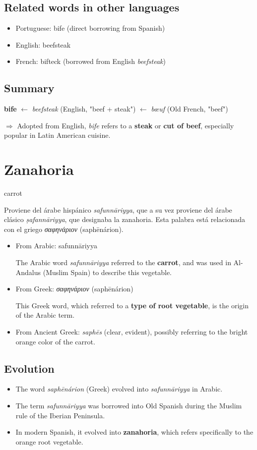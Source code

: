 \documentclass[10pt]{book}
\newcommand{\wordentry}[2]{
	\large #1
	\vspace{-0.5em}
	\begin{etymologybox}
		#2
	\end{etymologybox}
}
\let\oldsection\section
\renewcommand{\section}[1]{
	\needspace{8\baselineskip}
	\oldsection{#1}
}
\begin{document}
	\subsection*{Related words in other languages}
	\begin{itemize}
		\item Portuguese: bife (direct borrowing from Spanish)
		\item English: beefsteak
		\item French: bifteck (borrowed from English \textit{beefsteak})
	\end{itemize}
	
	\subsection*{Summary}
	\textbf{bife} $\leftarrow$ \textit{beefsteak} (English, "beef + steak") $\leftarrow$ \textit{bœuf} (Old French, "beef")
	
	$\Rightarrow$ Adopted from English, \textit{bife} refers to a \textbf{steak} or \textbf{cut of beef}, especially popular in Latin American cuisine.
	

	\section{Zanahoria}
	\wordentry{carrot}{
		Proviene del árabe hispánico \textit{safunnāriyya}, que a su vez proviene del árabe clásico \textit{ṣafannāriyya}, que designaba la zanahoria. Esta palabra está relacionada con el griego \textit{σαφηνάριον} (saphēnárion).
		\begin{itemize}
			\item From Arabic: safunnāriyya
			
			The Arabic word \textit{safunnāriyya} referred to the \textbf{carrot}, and was used in Al-Andalus (Muslim Spain) to describe this vegetable.
			
			\item From Greek: \textit{σαφηνάριον} (saphēnárion)
			
			This Greek word, which referred to a \textbf{type of root vegetable}, is the origin of the Arabic term.
			
			\item From Ancient Greek: \textit{saphēs} (clear, evident), possibly referring to the bright orange color of the carrot.
		\end{itemize}
	}
	
	\subsection*{Evolution}
	\begin{itemize}
		\item The word \textit{saphēnárion} (Greek) evolved into \textit{safunnāriyya} in Arabic.
		\item The term \textit{safunnāriyya} was borrowed into Old Spanish during the Muslim rule of the Iberian Peninsula.
		\item In modern Spanish, it evolved into \textbf{zanahoria}, which refers specifically to the orange root vegetable.
	\end{itemize}
	
\end{document}
